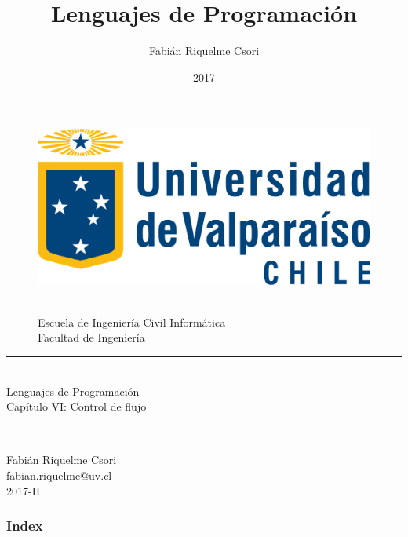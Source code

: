 \documentclass[handout]{beamer} %
\title{Lenguajes de Programación}                     %
\author{Fabián Riquelme Csori}                        %
\date{2017}                                           %
\institute{Universidad de Valparaíso}                 %
\newcommand{\HRule}{\rule{\linewidth}{0.2mm}\\[1ex]}
\begin{document}
%

\begin{frame}[plain]
  \begin{figure}[h]
    \begin{minipage}{0.3\textwidth}
    \includegraphics[width=.9\textwidth]{./image/logo-UV.png}
    \end{minipage}
    \begin{minipage}{0.65\textwidth}
     $~$\\[3.6ex]
     \footnotesize{Escuela de Ingeniería Civil Informática}\\
     \footnotesize{Facultad de Ingeniería}
    \end{minipage}
  \end{figure}
  \begin{center}
    \vspace{1ex}
    \HRule
    \Large{Lenguajes de Programación}\\{\small Capítulo VI: Control de flujo}\\[-1ex]
    \HRule\vspace{1ex}
    \large{Fabián Riquelme Csori}\\[.5ex]\footnotesize{fabian.riquelme@uv.cl}\\[6ex] {\tiny 2017-II}\\[6ex]
  \end{center}
\end{frame}

\begin{frame}
 \frametitle{Index}
 \scriptsize 			%
 \tableofcontents		%
\end{frame}
\end{document}
